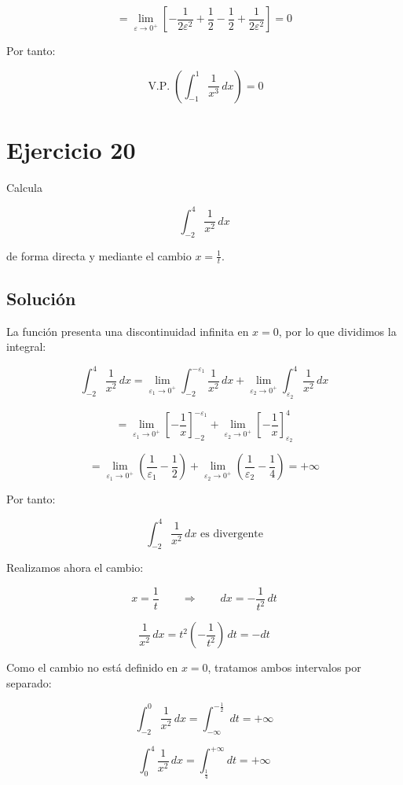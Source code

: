 \documentclass[fleqn]{article}
\begin{document}
	\[
	=
	\lim_{\varepsilon\to0^+}
	\left[
	-\frac{1}{2\varepsilon^2}
	+\frac{1}{2}
	-\frac{1}{2}
	+\frac{1}{2\varepsilon^2}
	\right]
	=
	0
	\]

	Por tanto:

	\[
	\boxed{
	\operatorname{V.P.}
	\left(
	\int_{-1}^{1}\frac{1}{x^3}\,dx
	\right)
	=
	0
	}
	\]

\section{Ejercicio 20}
	Calcula

	\[
	\int_{-2}^{4}\frac{1}{x^2}\,dx
	\]

	de forma directa y mediante el cambio $x=\frac{1}{t}$.

	\subsection{Solución}

	La función presenta una discontinuidad infinita en $x=0$, por lo que dividimos la integral:

	\[
	\int_{-2}^{4}\frac{1}{x^2}\,dx
	=
	\lim_{\varepsilon_1\to0^+}
	\int_{-2}^{-\varepsilon_1}\frac{1}{x^2}\,dx
	+
	\lim_{\varepsilon_2\to0^+}
	\int_{\varepsilon_2}^{4}\frac{1}{x^2}\,dx
	\]

	\[
	=
	\lim_{\varepsilon_1\to0^+}
	\left[
	-\frac{1}{x}
	\right]_{-2}^{-\varepsilon_1}
	+
	\lim_{\varepsilon_2\to0^+}
	\left[
	-\frac{1}{x}
	\right]_{\varepsilon_2}^{4}
	\]

	\[
	=
	\lim_{\varepsilon_1\to0^+}
	\left(
	\frac{1}{\varepsilon_1}-\frac{1}{2}
	\right)
	+
	\lim_{\varepsilon_2\to0^+}
	\left(
	\frac{1}{\varepsilon_2}-\frac{1}{4}
	\right)
	=
	+\infty
	\]

	Por tanto:

	\[
	\boxed{
	\int_{-2}^{4}\frac{1}{x^2}\,dx
	\text{ es divergente}
	}
	\]

	Realizamos ahora el cambio:

	\[
	x=\frac{1}{t}
	\qquad\Longrightarrow\qquad
	dx=-\frac{1}{t^2}\,dt
	\]

	\[
	\frac{1}{x^2}\,dx
	=
	t^2\left(-\frac{1}{t^2}\right)\,dt
	=
-dt
	\]

	Como el cambio no está definido en $x=0$, tratamos ambos intervalos por separado:

	\[
	\int_{-2}^{0}\frac{1}{x^2}\,dx
	=
	\int_{-\infty}^{-\frac{1}{2}}dt
	=
	+\infty
	\]

	\[
	\int_{0}^{4}\frac{1}{x^2}\,dx
	=
	\int_{\frac{1}{4}}^{+\infty}dt
	=
	+\infty
	\]
\end{document}
